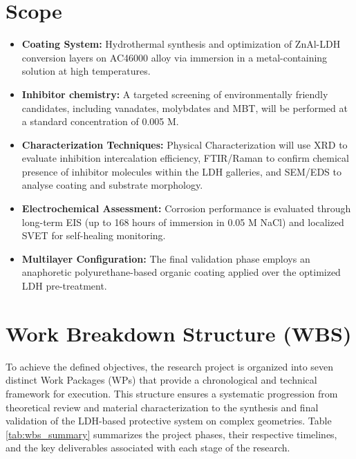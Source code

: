 \documentclass[11pt,twoside,a4paper]{report}
\begin{document}
\section{Scope}
\begin{itemize}
    \item \textbf{Coating System:} Hydrothermal synthesis and optimization of ZnAl-LDH conversion layers on AC46000 alloy via immersion in a metal-containing solution at high temperatures.
    
    \item \textbf{Inhibitor chemistry:} A targeted screening of environmentally friendly candidates, including vanadates, molybdates and MBT, will be performed at a standard concentration of 0.005 M.
    
    \item \textbf{Characterization Techniques:} Physical Characterization will use XRD to evaluate inhibition intercalation efficiency, FTIR/Raman to confirm chemical presence of inhibitor molecules within the LDH galleries, and SEM/EDS to analyse coating and substrate morphology.
    
    \item \textbf{Electrochemical Assessment:} Corrosion performance is evaluated through long-term EIS (up to 168 hours of immersion in 0.05 M NaCl) and localized SVET for self-healing monitoring.
    
    \item \textbf{Multilayer Configuration:} The final validation phase employs an anaphoretic polyurethane-based organic coating applied over the optimized LDH pre-treatment.
\end{itemize}

\section{Work Breakdown Structure (WBS)}
To achieve the defined objectives, the research project is organized into seven distinct Work Packages (WPs) that provide a chronological and technical framework for execution. This structure ensures a systematic progression from theoretical review and material characterization to the synthesis and final validation of the LDH-based protective system on complex geometries. Table \ref{tab:wbs_summary} summarizes the project phases, their respective timelines, and the key deliverables associated with each stage of the research.
\end{document}
